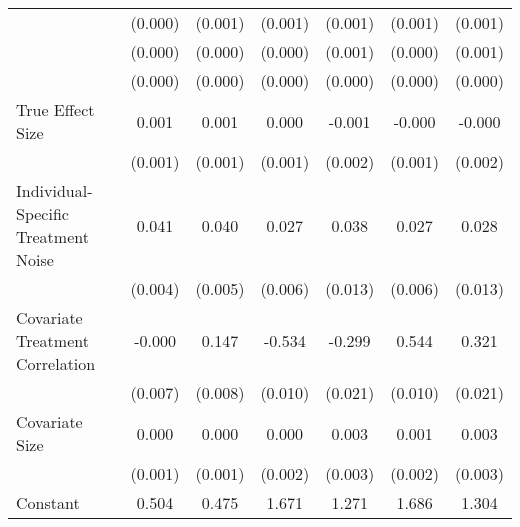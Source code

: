 \begin{table}[htbp]
\begin{tabular}{l*{6}{c}}
                    &     (0.000)         &     (0.001)         &     (0.001)         &     (0.001)         &     (0.001)         &     (0.001)         \\
                    &     (0.000)         &     (0.000)         &     (0.000)         &     (0.001)         &     (0.000)         &     (0.001)         \\
                    &     (0.000)         &     (0.000)         &     (0.000)         &     (0.000)         &     (0.000)         &     (0.000)         \\
True Effect Size    &       0.001         &       0.001\sym{*}  &       0.000         &      -0.001         &      -0.000         &      -0.000         \\
                    &     (0.001)         &     (0.001)         &     (0.001)         &     (0.002)         &     (0.001)         &     (0.002)         \\
Individual-Specific Treatment Noise&       0.041\sym{***}&       0.040\sym{***}&       0.027\sym{***}&       0.038\sym{**} &       0.027\sym{***}&       0.028\sym{*}  \\
                    &     (0.004)         &     (0.005)         &     (0.006)         &     (0.013)         &     (0.006)         &     (0.013)         \\
Covariate Treatment Correlation&      -0.000         &       0.147\sym{***}&      -0.534\sym{***}&      -0.299\sym{***}&       0.544\sym{***}&       0.321\sym{***}\\
                    &     (0.007)         &     (0.008)         &     (0.010)         &     (0.021)         &     (0.010)         &     (0.021)         \\
Covariate Size      &       0.000         &       0.000         &       0.000         &       0.003         &       0.001         &       0.003         \\
                    &     (0.001)         &     (0.001)         &     (0.002)         &     (0.003)         &     (0.002)         &     (0.003)         \\
Constant            &       0.504\sym{***}&       0.475\sym{***}&       1.671\sym{***}&       1.271\sym{***}&       1.686\sym{***}&       1.304\sym{***}\\

\end{tabular}
\end{table}
